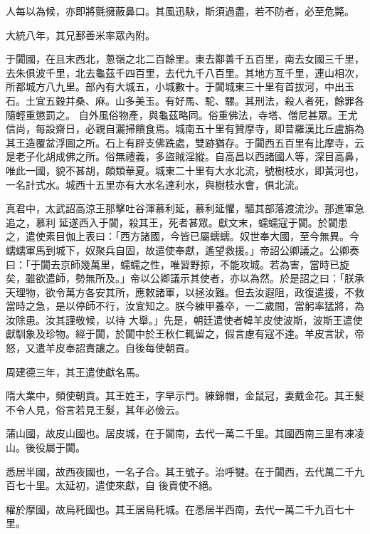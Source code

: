 \begin{pinyinscope}
 人每以為候，亦即將氈擁蔽鼻口。其風迅駃，斯須過盡，若不防者，必至危斃。



 大統八年，其兄鄯善米率眾內附。



 于闐國，在且末西北，蔥嶺之北二百餘里。東去鄯善千五百里，南去女國三千里，去朱俱波千里，北去龜茲千四百里，去代九千八百里。其地方亙千里，連山相次，所都城方八九里。部內有大城五，小城數十。于闐城東三十里有首拔河，中出玉石。土宜五穀并桑、麻。山多美玉。有好馬、駝、騾。其刑法，殺人者死，餘罪各隨輕重懲罰之。
 自外風俗物產，與龜茲略同。俗重佛法，寺塔、僧尼甚眾。王尤信尚，每設齋日，必親自灑掃饋食焉。城南五十里有贊摩寺，即昔羅漢比丘盧旃為其王造覆盆浮圖之所。石上有辟支佛跣處，雙跡猶存。于闐西五百里有比摩寺，云是老子化胡成佛之所。俗無禮義，多盜賊淫縱。自高昌以西諸國人等，深目高鼻，唯此一國，貌不甚胡，頗類華夏。城東二十里有大水北流，號樹枝水，即黃河也，一名計式水。城西十五里亦有大水名達利水，與樹枝水會，俱北流。



 真君中，太武詔高涼王那擊吐谷渾慕利延，慕利延懼，驅其部落渡流沙。那進軍急追之，慕利
 延遂西入于闐，殺其王，死者甚眾。獻文末，蠕蠕寇于闐。於闐患之，遣使素目伽上表曰：「西方諸國，今皆已屬蠕蠕。奴世奉大國，至今無異。今蠕蠕軍馬到城下，奴聚兵自固，故遣使奉獻，遙望救援。」帝詔公卿議之。公卿奏曰：「于闐去京師幾萬里，蠕蠕之性，唯習野掠，不能攻城。若為害，當時已旋矣，雖欲遣師，勢無所及。」帝以公卿議示其使者，亦以為然。於是詔之曰：「朕承天理物，欲令萬方各安其所，應敕諸軍，以拯汝難。但去汝遐阻，政復遣援，不救當時之急，是以停師不行，汝宜知之。朕今練甲養卒，一二歲間，當躬率猛將，為汝除患。汝其謹敬候，以待
 大舉。」先是，朝廷遣使者韓羊皮使波斯，波斯王遣使獻馴象及珍物。經于闐，於闐中於王秋仁輒留之，假言慮有寇不達。羊皮言狀，帝怒，又遣羊皮奉詔責讓之。自後每使朝貢。



 周建德三年，其王遣使獻名馬。



 隋大業中，頻使朝貢。其王姓王，字早示門。練錦帽，金鼠冠，妻戴金花。其王髮不令人見，俗言若見王髮，其年必儉云。



 蒲山國，故皮山國也。居皮城，在于闐南，去代一萬二千里。其國西南三里有凍凌山。後役屬于闐。



 悉居半國，故西夜國也，一名子合。其王號子。治呼犍。在于闐西，去代萬二千九百七十里。太延初，遣使來獻，自
 後貢使不絕。



 權於摩國，故烏秅國也。其王居烏秅城。在悉居半西南，去代一萬二千九百七十里。




\end{pinyinscope}
